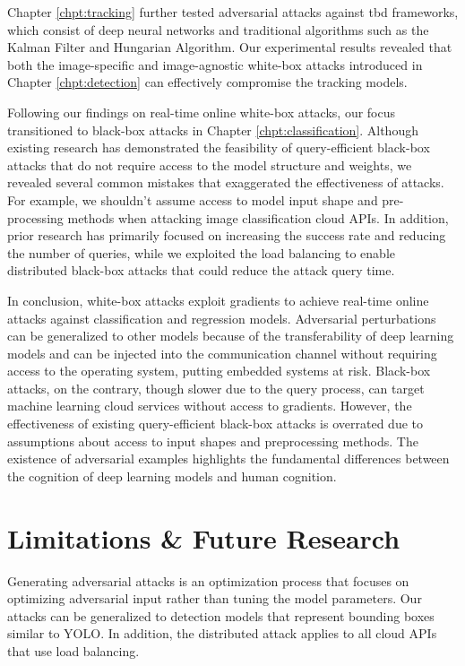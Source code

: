 Chapter \ref{chpt:tracking} further tested adversarial attacks against \acrfull{tbd} frameworks, which consist of deep neural networks and traditional algorithms such as the Kalman Filter and Hungarian Algorithm. Our experimental results revealed that both the image-specific and image-agnostic white-box attacks introduced in Chapter \ref{chpt:detection} can effectively compromise the tracking models.

Following our findings on real-time online white-box attacks, our focus transitioned to black-box attacks in Chapter \ref{chpt:classification}. Although existing research has demonstrated the feasibility of query-efficient black-box attacks that do not require access to the model structure and weights, we revealed several common mistakes that exaggerated the effectiveness of attacks. For example, we shouldn't assume access to model input shape and pre-processing methods when attacking image classification cloud APIs. In addition, prior research has primarily focused on increasing the success rate and reducing the number of queries, while we exploited the load balancing to enable distributed black-box attacks that could reduce the attack query time.

In conclusion, white-box attacks exploit gradients to achieve real-time online attacks against classification and regression models. Adversarial perturbations can be generalized to other models because of the transferability of deep learning models and can be injected into the communication channel without requiring access to the operating system, putting embedded systems at risk. Black-box attacks, on the contrary, though slower due to the query process, can target machine learning cloud services without access to gradients. However, the effectiveness of existing query-efficient black-box attacks is overrated due to assumptions about access to input shapes and preprocessing methods. The existence of adversarial examples highlights the fundamental differences between the cognition of deep learning models and human cognition.
\section{Limitations \& Future Research}

Generating adversarial attacks is an optimization process that focuses on optimizing adversarial input rather than tuning the model parameters. Our attacks can be generalized to detection models that represent bounding boxes similar to YOLO. In addition, the distributed attack applies to all cloud APIs that use load balancing.

